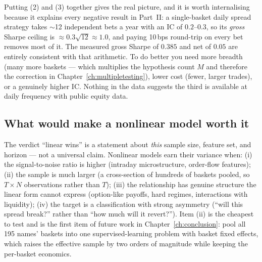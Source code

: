 \begin{remark}
Putting (2) and (3) together gives the real picture, and it is worth internalising
because it explains every negative result in Part~II: a single-basket daily spread
strategy takes $\sim$12 independent bets a year with an IC of $0.2$--$0.3$, so its
\emph{gross} Sharpe ceiling is $\approx0.3\sqrt{12}\approx1.0$, and paying 10\,bps
round-trip on every bet removes most of it. The measured gross Sharpe of $0.385$ and net
of $0.05$ are entirely consistent with that arithmetic. To do better you need more
breadth (many more baskets --- which multiplies the hypothesis count $M$ and therefore
the correction in Chapter~\ref{ch:multipletesting}), lower cost (fewer, larger trades),
or a genuinely higher IC. Nothing in the data suggests the third is available at daily
frequency with public equity data.
\end{remark}

\subsection{What would make a nonlinear model worth it}
\label{sec:nonlinear:when}

The verdict ``linear wins'' is a statement about \emph{this} sample size, feature set, and
horizon --- not a universal claim. Nonlinear models earn their variance when: (i) the
signal-to-noise ratio is higher (intraday microstructure, order-flow features); (ii) the
sample is much larger (a cross-section of hundreds of baskets pooled, so $T\times N$
observations rather than $T$); (iii) the relationship has genuine structure the linear
form cannot express (option-like payoffs, hard regimes, interactions with liquidity);
(iv) the target is a classification with strong asymmetry (``will this spread break?''
rather than ``how much will it revert?''). Item (ii) is the cheapest to test and is the
first item of future work in Chapter~\ref{ch:conclusion}: pool all 195 names' baskets into one
supervised-learning problem with basket fixed effects, which raises the effective sample
by two orders of magnitude while keeping the per-basket economics.
